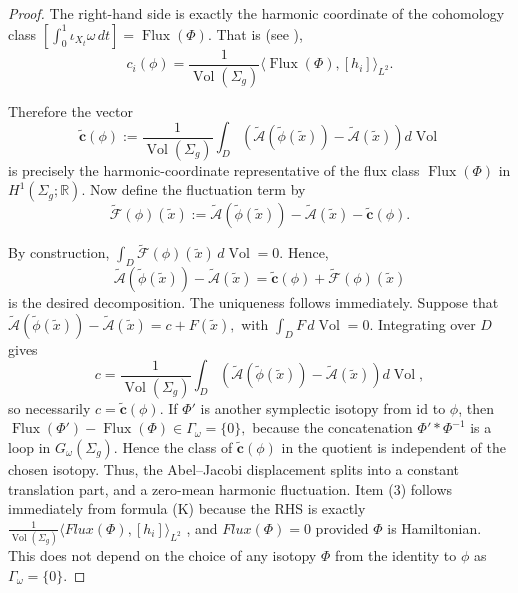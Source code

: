 \documentclass[11pt]{article}
\theoremstyle{definition}
\begin{document}
\begin{proof}
		The right-hand side is exactly the harmonic coordinate of the cohomology class
		$\left[\int_0^1\iota_{X_t}\omega\,dt\right] = \operatorname{Flux}(\Phi).$ That
		is (see \cite{Tchuaga2018}), 
		\[
		c_i(\phi) = \frac{1}{\operatorname{Vol}(\Sigma_g)} \langle
		\operatorname{Flux}(\Phi), [h_i]\rangle_{L^2}.
		\]
		
		Therefore the vector
		\[
		\widetilde{\mathbf c}(\phi)
		:=
		\frac1{\operatorname{Vol}(\Sigma_g)}
		\int_D
		\left(
		\widetilde{\mathcal A}(\widetilde\phi(\tilde x))
		-
		\widetilde{\mathcal A}(\tilde x)
		\right)
		d\operatorname{Vol}
		\]
		is precisely the harmonic-coordinate representative of the flux class
		$\operatorname{Flux}(\Phi)$ in $H^1(\Sigma_g;\mathbb R)$. Now define the
		fluctuation term by 
		\[
		\widetilde{\mathcal F}(\phi)(\tilde x)
		:=
		\widetilde{\mathcal A}(\widetilde\phi(\tilde x))
		-
		\widetilde{\mathcal A}(\tilde x)
		-
		\widetilde{\mathbf c}(\phi).
		\]
		
		By construction, $\int_D \widetilde{\mathcal F}(\phi)(\tilde x)
		\,d\operatorname{Vol} =0.$ Hence,
		\[
		\widetilde{\mathcal A}(\widetilde\phi(\tilde x))
		-
		\widetilde{\mathcal A}(\tilde x)
		=
		\widetilde{\mathbf c}(\phi)
		+
		\widetilde{\mathcal F}(\phi)(\tilde x)
		\]
		is the desired decomposition. The uniqueness follows immediately. Suppose that
		$\widetilde{\mathcal A}(\widetilde\phi(\tilde x)) - \widetilde{\mathcal
			A}(\tilde x) = c+F(\tilde x),$ with $\int_D F\,d\operatorname{Vol}=0.$
		Integrating over $D$ gives 
		\[
		c
		=
		\frac1{\operatorname{Vol}(\Sigma_g)}
		\int_D
		\left(
		\widetilde{\mathcal A}(\widetilde\phi(\tilde x))
		-
		\widetilde{\mathcal A}(\tilde x)
		\right)
		d\operatorname{Vol},
		\]
		so necessarily $c=\widetilde{\mathbf c}(\phi).$ If $\Phi'$ is another symplectic
		isotopy from $\mathrm{id}$ to $\phi$, then $\operatorname{Flux}(\Phi') -
		\operatorname{Flux}(\Phi) \in \Gamma_\omega = \{0\},$ because the concatenation
		$\Phi'*\Phi^{-1}$ is a loop in $G_\omega(\Sigma_g)$. Hence the class of
		$\widetilde{\mathbf c}(\phi)$ in the quotient is independent of the chosen
		isotopy. Thus, the Abel--Jacobi displacement splits into a constant translation
		part, and a zero-mean harmonic fluctuation. Item (3) follows immediately from
		formula (K) because the RHS is exactly $\frac1{\operatorname{Vol}(\Sigma_g)}
		\langle Flux(\Phi), [h_i]\rangle_{L^2}$ \cite{Tchuaga2018}, and $
		Flux(\Phi) = 0$ provided $\Phi$ is Hamiltonian. This does not depend on the
		choice of any isotopy $\Phi$ from the identity to $\phi$ as $\Gamma_\omega =
		\{0\}$.
		

\end{proof}
\end{document}
